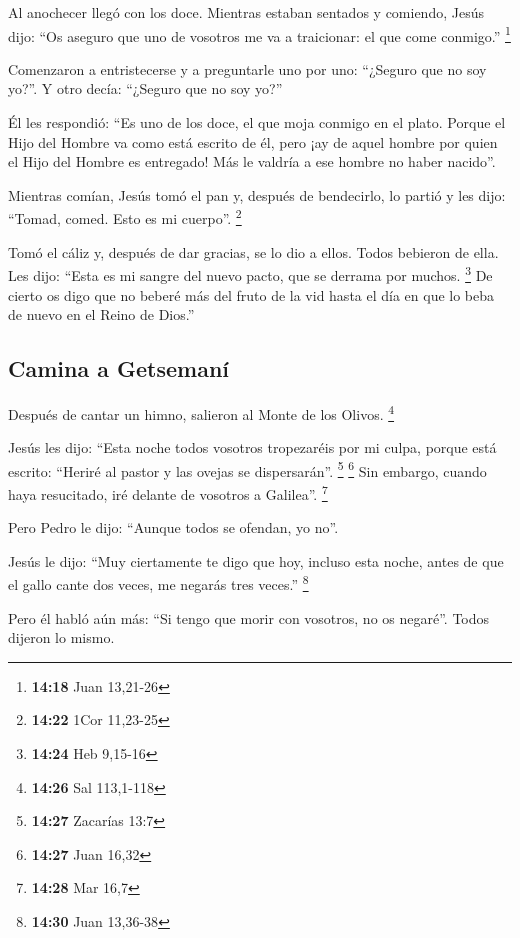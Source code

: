 \begin{paracol}{2}
 Al anochecer llegó con los doce. 
Mientras estaban sentados y comiendo, Jesús dijo: ``Os aseguro que uno
de vosotros me va a traicionar: el que come conmigo.'' \footnote{\textbf{14:18}
  Juan 13,21-26}

 Comenzaron a entristecerse y a preguntarle uno por uno:
``¿Seguro que no soy yo?''. Y otro decía: ``¿Seguro que no soy yo?''

 Él les respondió: ``Es uno de los doce, el que moja
conmigo en el plato.  Porque el Hijo del Hombre va como
está escrito de él, pero ¡ay de aquel hombre por quien el Hijo del
Hombre es entregado! Más le valdría a ese hombre no haber nacido''.

 Mientras comían, Jesús tomó el pan y, después de
bendecirlo, lo partió y les dijo: ``Tomad, comed. Esto es mi cuerpo''.
\footnote{\textbf{14:22} 1Cor 11,23-25}

 Tomó el cáliz y, después de dar gracias, se lo dio a
ellos. Todos bebieron de ella.  Les dijo: ``Esta es mi
sangre del nuevo pacto, que se derrama por muchos. \footnote{\textbf{14:24}
  Heb 9,15-16}  De cierto os digo que no beberé más del
fruto de la vid hasta el día en que lo beba de nuevo en el Reino de
Dios.''

\hypertarget{camina-a-getsemanuxed}{%
\subsection{Camina a Getsemaní}\label{camina-a-getsemanuxed}}

 Después de cantar un himno, salieron al Monte de los
Olivos. \footnote{\textbf{14:26} Sal 113,1-118}

 Jesús les dijo: ``Esta noche todos vosotros tropezaréis
por mi culpa, porque está escrito: ``Heriré al pastor y las ovejas se
dispersarán''. \footnote{\textbf{14:27} Zacarías 13:7} \footnote{\textbf{14:27}
  Juan 16,32}  Sin embargo, cuando haya resucitado, iré
delante de vosotros a Galilea''. \footnote{\textbf{14:28} Mar 16,7}

 Pero Pedro le dijo: ``Aunque todos se ofendan, yo no''.

 Jesús le dijo: ``Muy ciertamente te digo que hoy,
incluso esta noche, antes de que el gallo cante dos veces, me negarás
tres veces.'' \footnote{\textbf{14:30} Juan 13,36-38}

 Pero él habló aún más: ``Si tengo que morir con
vosotros, no os negaré''. Todos dijeron lo mismo.


\end{paracol}
